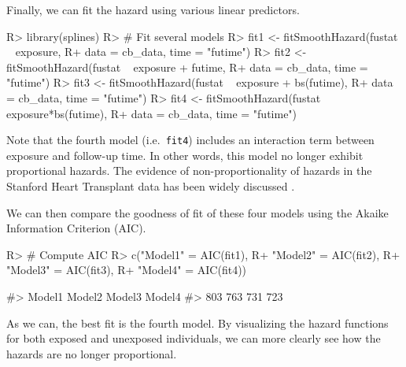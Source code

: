 \documentclass[
]{jss}
\begin{document}
Finally, we can fit the hazard using various linear predictors.

\begin{CodeChunk}

\begin{CodeInput}
R> library(splines)
R> # Fit several models
R> fit1 <- fitSmoothHazard(fustat ~ exposure,
R+                         data = cb_data, time = "futime")
R> fit2 <- fitSmoothHazard(fustat ~ exposure + futime,
R+                         data = cb_data, time = "futime")
R> fit3 <- fitSmoothHazard(fustat ~ exposure + bs(futime),
R+                         data = cb_data, time = "futime")
R> fit4 <- fitSmoothHazard(fustat ~ exposure*bs(futime),
R+                         data = cb_data, time = "futime")
\end{CodeInput}
\end{CodeChunk}

Note that the fourth model (i.e.~\texttt{fit4}) includes an interaction
term between exposure and follow-up time. In other words, this model no
longer exhibit proportional hazards. The evidence of non-proportionality
of hazards in the Stanford Heart Transplant data has been widely
discussed \citep{arjas1988graphical}.

We can then compare the goodness of fit of these four models using the
Akaike Information Criterion (AIC).

\begin{CodeChunk}

\begin{CodeInput}
R> # Compute AIC
R> c("Model1" = AIC(fit1),
R+   "Model2" = AIC(fit2),
R+   "Model3" = AIC(fit3),
R+   "Model4" = AIC(fit4))
\end{CodeInput}

\begin{CodeOutput}
#> Model1 Model2 Model3 Model4 
#>    803    763    731    723
\end{CodeOutput}
\end{CodeChunk}

As we can, the best fit is the fourth model. By visualizing the hazard
functions for both exposed and unexposed individuals, we can more
clearly see how the hazards are no longer proportional.
\end{document}
